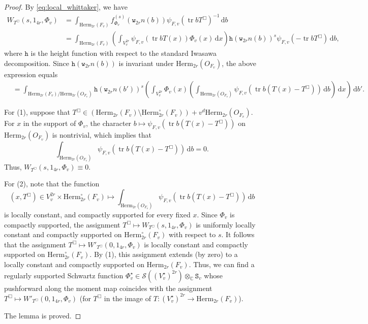 \documentclass[12pt]{amsart}
\numberwithin{equation}{section}
\theoremstyle{plain}
\theoremstyle{definition}
\theoremstyle{remark}
\renewcommand{\d}[1]{\mathbb{#1}}
\renewcommand{\r}[1]{\mathrm{#1}}
\newcommand{\s}[1]{\mathscr{#1}}
\renewcommand{\(}{\left(}
\renewcommand{\)}{\right)}
\newcommand{\dC}{\d C}
\newcommand{\rd}{\,\r d}
\newcommand{\sS}{\s S}
\newcommand{\tS}{\mathtt{S}}
\renewcommand{\th}{\mathtt{h}}
\newcommand{\tw}{\mathtt{w}}
\newcommand{\Herm}{\r{Herm}}
\DeclareMathOperator{\tr}{tr}
\begin{document}
\begin{proof}
By \eqref{eq:local_whittaker}, we have
\begin{align*}
W_{T^\Box}(s,1_{4r},\Phi_v)&=\int_{\Herm_{2r}(F_v)}f^{(s)}_{\Phi_v}(\tw_{2r} n(b))\psi_{F,v}(\tr bT^\Box)^{-1}\rd b \\
&=\int_{\Herm_{2r}(F_v)}\(\int_{V_v^{2r}}\psi_{F,v}(\tr bT(x))\Phi_v(x)\rd x\)\th(\tw_{2r} n(b))^s\psi_{F,v}(-\tr b T^\Box)\rd b,
\end{align*}
where $\th$ is the height function with respect to the standard Iwasawa decomposition. Since $\th(\tw_{2r} n(b))$ is invariant under $\Herm_{2r}(O_{F_v})$, the above expression equals
\begin{align*}
&=\int_{\Herm_{2r}(F_v)/\Herm_{2r}(O_{F_v})}\th(\tw_{2r} n(b'))^s\(\int_{V_v^{2r}}\Phi_v(x)\(\int_{\Herm_{2r}(O_{F_v})}\psi_{F,v}(\tr b(T(x)-T^\Box))\rd b\)\rd x\)\rd b'.
\end{align*}

For (1), suppose that $T^\Box\in\(\Herm_{2r}(F_v)\setminus\Herm_{2r}^\circ(F_v)\)+v^d\Herm_{2r}(O_{F_v})$. For $x$ in the support of $\Phi_v$, the character $b\mapsto\psi_{F,v}(\tr b(T(x)-T^\Box))$ on $\Herm_{2r}(O_{F_v})$ is nontrivial, which implies that
\[
\int_{\Herm_{2r}(O_{F_v})}\psi_{F,v}(\tr b(T(x)-T^\Box))\rd b=0.
\]
Thus, $W_{T^\Box}(s,1_{4r},\Phi_v)\equiv 0$.

For (2), note that the function
\[
(x,T^\Box)\in V_v^{2r}\times\Herm_{2r}^\circ(F_v)
\mapsto\int_{\Herm_{2r}(O_{F_v})}\psi_{F,v}(\tr b(T(x)-T^\Box))\rd b
\]
is locally constant, and compactly supported for every fixed $x$. Since $\Phi_v$ is compactly supported, the assignment $T^\Box\mapsto W_{T^\Box}(s,1_{4r},\Phi_v)$ is uniformly locally constant and compactly supported on $\Herm_{2r}^\circ(F_v)$ with respect to $s$. It follows that the assignment $T^\Box\mapsto W'_{T^\Box}(0,1_{4r},\Phi_v)$ is locally constant and compactly supported on $\Herm_{2r}^\circ(F_v)$. By (1), this assignment extends (by zero) to a locally constant and compactly supported on $\Herm_{2r}(F_v)$. Thus, we can find a regularly supported Schwartz function $\Phi^\star_v\in\sS((V^\star_v)^{2r})\otimes_\dC\tS_v$ whose pushforward along the moment map coincides with the assignment $T^\Box\mapsto W'_{T^\Box}(0,1_{4r},\Phi_v)$ (for $T^\Box$ in the image of $T\colon(V^\star_v)^{2r}\to\Herm_{2r}(F_v)$).

The lemma is proved.
\end{proof}
\end{document}
